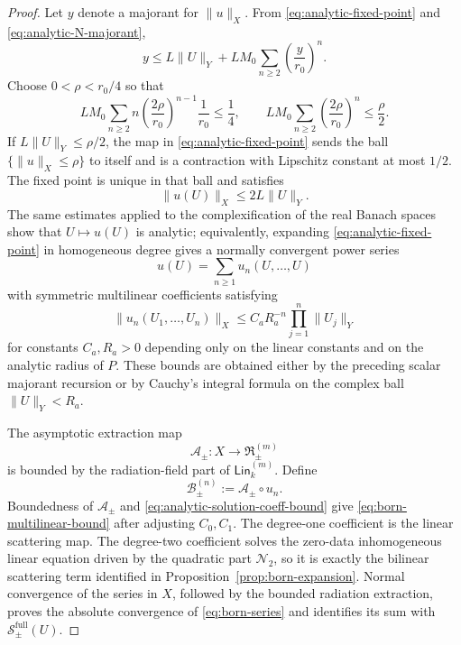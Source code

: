 \documentclass[11pt]{article}
\numberwithin{equation}{section}
\theoremstyle{plain}
\theoremstyle{definition}
\theoremstyle{remark}
\newcommand{\Lin}{\mathsf{Lin}}
\begin{document}
\begin{proof}
Let \(y\) denote a majorant for \(\|u\|_X\).  From \eqref{eq:analytic-fixed-point} and \eqref{eq:analytic-N-majorant},
\begin{equation}\label{eq:majorant-equation}
 y\le L\|U\|_Y+L M_0\sum_{n\ge2}\left(\frac{y}{r_0}\right)^n.
\end{equation}
Choose \(0<\rho<r_0/4\) so that
\[
 L M_0\sum_{n\ge2} n\left(\frac{2\rho}{r_0}\right)^{n-1}\frac1{r_0}
 \le \frac14,
 \qquad
 L M_0\sum_{n\ge2}\left(\frac{2\rho}{r_0}\right)^n\le \frac{\rho}{2}.
\]
If \(L\|U\|_Y\le \rho/2\), the map in \eqref{eq:analytic-fixed-point} sends the ball \(\{\|u\|_X\le \rho\}\) to itself and is a contraction with Lipschitz constant at most \(1/2\).  The fixed point is unique in that ball and satisfies
\begin{equation}\label{eq:solution-majorant-bound}
 \|u(U)\|_X\le 2L\|U\|_Y.
\end{equation}
The same estimates applied to the complexification of the real Banach spaces show that \(U\mapsto u(U)\) is analytic; equivalently, expanding \eqref{eq:analytic-fixed-point} in homogeneous degree gives a normally convergent power series
\[
 u(U)=\sum_{n\ge1}u_n(U,\ldots,U)
\]
with symmetric multilinear coefficients satisfying
\begin{equation}\label{eq:analytic-solution-coeff-bound}
 \|u_n(U_1,\ldots,U_n)\|_X
 \le C_a R_a^{-n}\prod_{j=1}^n\|U_j\|_Y
\end{equation}
for constants \(C_a,R_a>0\) depending only on the linear constants and on the analytic radius of \(P\).  These bounds are obtained either by the preceding scalar majorant recursion or by Cauchy's integral formula on the complex ball \(\|U\|_Y<R_a\).

The asymptotic extraction map
\[
\mathscr A_\pm:X\to\mathfrak R_\pm^{(m)}
\]
is bounded by the radiation-field part of \(\Lin_k^{(m)}\).  Define
\[
\mathscr B_\pm^{(n)}:=\mathscr A_\pm\circ u_n.
\]
Boundedness of \(\mathscr A_\pm\) and \eqref{eq:analytic-solution-coeff-bound} give \eqref{eq:born-multilinear-bound} after adjusting \(C_0,C_1\).  The degree-one coefficient is the linear scattering map.  The degree-two coefficient solves the zero-data inhomogeneous linear equation driven by the quadratic part \(\mathcal N_2\), so it is exactly the bilinear scattering term identified in Proposition~\ref{prop:born-expansion}.  Normal convergence of the series in \(X\), followed by the bounded radiation extraction, proves the absolute convergence of \eqref{eq:born-series} and identifies its sum with \(\mathscr S_\pm^{\mathrm{full}}(U)\).

\end{proof}
\end{document}
